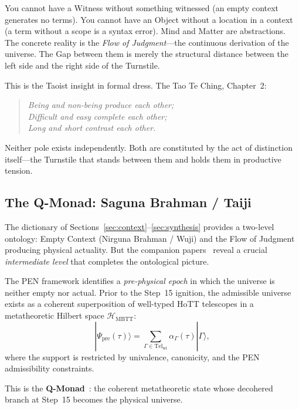 \documentclass[12pt,a4paper]{article}
\begin{document}
You cannot have a Witness without something witnessed (an empty context generates no terms). You cannot have an Object without a location in a context (a term without a scope is a syntax error). Mind and Matter are abstractions. The concrete reality is the \emph{Flow of Judgment}---the continuous derivation of the universe. The Gap between them is merely the structural distance between the left side and the right side of the Turnstile.

This is the Taoist insight in formal dress. The Tao Te Ching, Chapter~2:
\begin{quote}
\emph{Being and non-being produce each other;\\
Difficult and easy complete each other;\\
Long and short contrast each other.}
\end{quote}
Neither pole exists independently. Both are constituted by the act of distinction itself---the Turnstile that stands between them and holds them in productive tension.


\subsection{The Q-Monad: Saguna Brahman / Taiji}
\label{sec:qmonad}

The dictionary of Sections~\ref{sec:context}--\ref{sec:synthesis} provides a two-level ontology: Empty Context (Nirguna Brahman / Wuji) and the Flow of Judgment producing physical actuality. But the companion papers~\cite{pen1, pen2} reveal a crucial \emph{intermediate level} that completes the ontological picture.

The PEN framework identifies a \emph{pre-physical epoch} in which the universe is neither empty nor actual. Prior to the Step~15 ignition, the admissible universe exists as a coherent superposition of well-typed HoTT telescopes in a metatheoretic Hilbert space $\mathcal{H}_{\mathrm{MBTT}}$:
\begin{equation}
|\Psi_{\mathrm{pre}}(\tau)\rangle = \sum_{\Gamma \in \mathrm{Tel}_{\mathrm{wt}}} \alpha_\Gamma(\tau)|\Gamma\rangle,
\label{eq:qmonad}
\end{equation}
where the support is restricted by univalence, canonicity, and the PEN admissibility constraints.

This is the \textbf{Q-Monad}~\cite{pen2}: the coherent metatheoretic state whose decohered branch at Step~15 becomes the physical universe.
\end{document}
